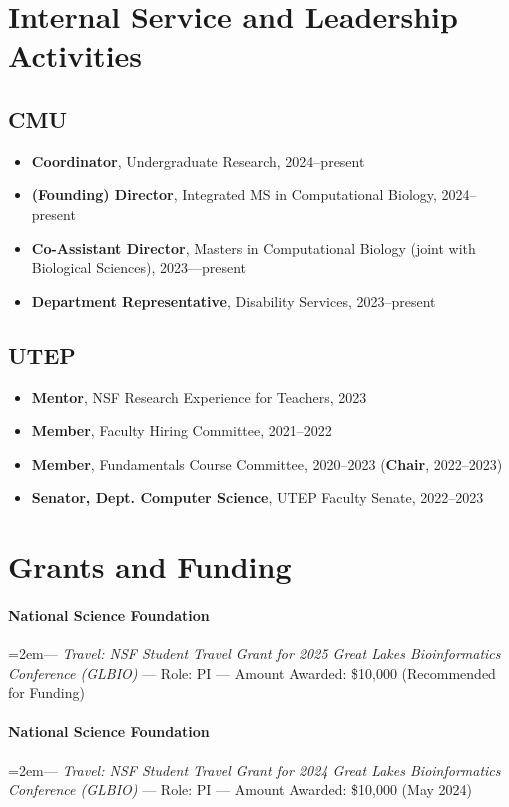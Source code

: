 \documentclass[10pt,letterpaper]{article}
\begin{document}
\section*{Internal Service and Leadership Activities}
\subsection*{CMU}
  \begin{itemize}
    \item \textbf{Coordinator}, Undergraduate Research, 2024--present
    \item \textbf{(Founding) Director}, Integrated MS in Computational Biology, 2024--present
    \item \textbf{Co-Assistant Director}, Masters in Computational Biology (joint with Biological Sciences), 2023---present
    \item \textbf{Department Representative}, Disability Services, 2023--present
  \end{itemize}
\subsection*{UTEP}
  \begin{itemize}
    \item \textbf{Mentor}, NSF Research Experience for Teachers, 2023
    \item \textbf{Member}, Faculty Hiring Committee, 2021--2022
    \item \textbf{Member}, Fundamentals Course Committee, 2020--2023 (\textbf{Chair}, 2022--2023)
    \item \textbf{Senator, Dept. Computer Science}, UTEP Faculty Senate, 2022--2023
    
  \end{itemize}


\section*{Grants and Funding}
\paragraph{National Science Foundation}  \hangindent=2em--- 
	\textit{Travel: NSF Student Travel Grant for 2025 Great Lakes Bioinformatics Conference (GLBIO)} ---
	Role: PI --- Amount Awarded: \$10,000 (Recommended for Funding)
	
\paragraph{National Science Foundation}  \hangindent=2em--- 
	\textit{Travel: NSF Student Travel Grant for 2024 Great Lakes Bioinformatics Conference (GLBIO)} ---
	Role: PI --- Amount Awarded: \$10,000 (May 2024)
\end{document}
